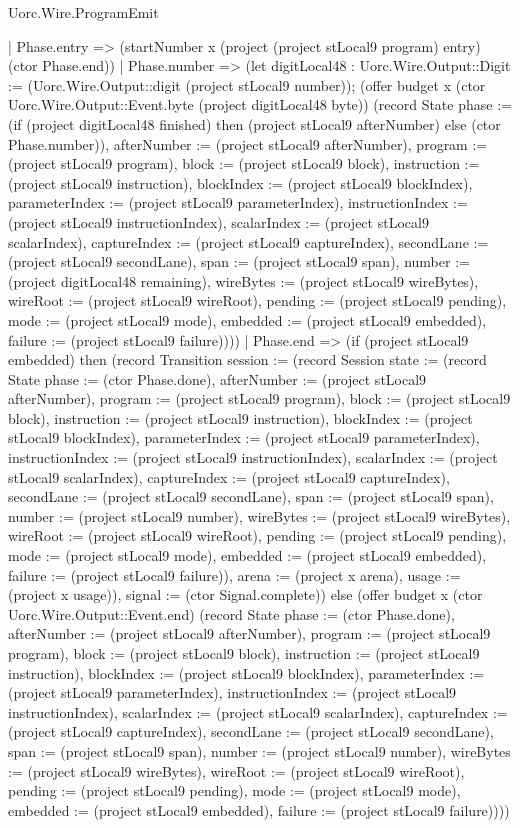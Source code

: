 \begin{lexlean}{Uorc.Wire.ProgramEmit}
\begin{semanticmodule}
{        | Phase.entry => (startNumber x (project (project stLocal9 program) entry) (ctor Phase.end))
        | Phase.number => (let digitLocal48 : Uorc.Wire.Output::Digit := (Uorc.Wire.Output::digit (project stLocal9 number)); (offer budget x (ctor Uorc.Wire.Output::Event.byte (project digitLocal48 byte)) (record State {phase := (if (project digitLocal48 finished) then (project stLocal9 afterNumber) else (ctor Phase.number)), afterNumber := (project stLocal9 afterNumber), program := (project stLocal9 program), block := (project stLocal9 block), instruction := (project stLocal9 instruction), blockIndex := (project stLocal9 blockIndex), parameterIndex := (project stLocal9 parameterIndex), instructionIndex := (project stLocal9 instructionIndex), scalarIndex := (project stLocal9 scalarIndex), captureIndex := (project stLocal9 captureIndex), secondLane := (project stLocal9 secondLane), span := (project stLocal9 span), number := (project digitLocal48 remaining), wireBytes := (project stLocal9 wireBytes), wireRoot := (project stLocal9 wireRoot), pending := (project stLocal9 pending), mode := (project stLocal9 mode), embedded := (project stLocal9 embedded), failure := (project stLocal9 failure)})))
        | Phase.end => (if (project stLocal9 embedded) then (record Transition {session := (record Session {state := (record State {phase := (ctor Phase.done), afterNumber := (project stLocal9 afterNumber), program := (project stLocal9 program), block := (project stLocal9 block), instruction := (project stLocal9 instruction), blockIndex := (project stLocal9 blockIndex), parameterIndex := (project stLocal9 parameterIndex), instructionIndex := (project stLocal9 instructionIndex), scalarIndex := (project stLocal9 scalarIndex), captureIndex := (project stLocal9 captureIndex), secondLane := (project stLocal9 secondLane), span := (project stLocal9 span), number := (project stLocal9 number), wireBytes := (project stLocal9 wireBytes), wireRoot := (project stLocal9 wireRoot), pending := (project stLocal9 pending), mode := (project stLocal9 mode), embedded := (project stLocal9 embedded), failure := (project stLocal9 failure)}), arena := (project x arena), usage := (project x usage)}), signal := (ctor Signal.complete)}) else (offer budget x (ctor Uorc.Wire.Output::Event.end) (record State {phase := (ctor Phase.done), afterNumber := (project stLocal9 afterNumber), program := (project stLocal9 program), block := (project stLocal9 block), instruction := (project stLocal9 instruction), blockIndex := (project stLocal9 blockIndex), parameterIndex := (project stLocal9 parameterIndex), instructionIndex := (project stLocal9 instructionIndex), scalarIndex := (project stLocal9 scalarIndex), captureIndex := (project stLocal9 captureIndex), secondLane := (project stLocal9 secondLane), span := (project stLocal9 span), number := (project stLocal9 number), wireBytes := (project stLocal9 wireBytes), wireRoot := (project stLocal9 wireRoot), pending := (project stLocal9 pending), mode := (project stLocal9 mode), embedded := (project stLocal9 embedded), failure := (project stLocal9 failure)})))
}
\end{semanticmodule}
\end{lexlean}
